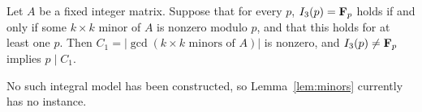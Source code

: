 \begin{lemma}\label{lem:minors}
Let $A$ be a fixed integer matrix. Suppose that for every $p$, $I_3(p)=\mathbf{F}_p$ holds if and only if some $k\times k$ minor of $A$ is nonzero modulo $p$, and that this holds for at least one $p$. Then $C_1=|\gcd(\text{$k\times k$ minors of }A)|$ is nonzero, and $I_3(p)\ne\mathbf{F}_p$ implies $p\mid C_1$.
\end{lemma}
No such integral model has been constructed, so Lemma~\ref{lem:minors} currently has no instance.
